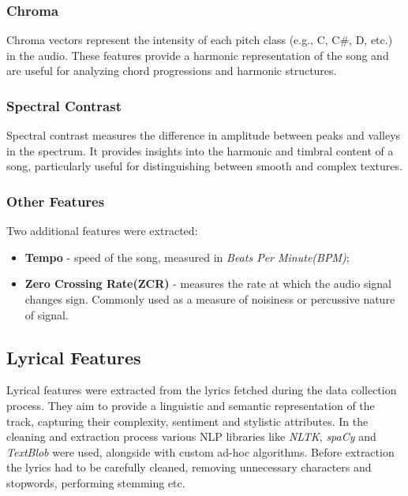 \subsubsection*{Chroma}
Chroma vectors represent the intensity of each pitch class (e.g., C, C#, D, etc.) in the audio.
These features provide a harmonic representation of the song and are useful for analyzing
chord progressions and harmonic structures.

\subsubsection*{Spectral Contrast}
Spectral contrast measures the difference in amplitude between peaks and
valleys in the spectrum. It provides insights into the harmonic and timbral
content of a song, particularly useful for distinguishing between smooth and
complex textures.

\subsubsection*{Other Features}
Two additional features were extracted:
\begin{itemize}
  \item \textbf{Tempo} - speed of the song, measured in
    \textit{Beats Per Minute(BPM)};
  \item \textbf{Zero Crossing Rate(ZCR)} - measures the rate at which the audio
    signal changes sign. Commonly used as a measure of noisiness or
    percussive nature of signal.
\end{itemize}


\subsection{Lyrical Features}
\label{sec:lyricalfeatures}

Lyrical features  were extracted from the lyrics fetched during the data
collection process. They aim to provide a linguistic and semantic
representation of the track, capturing their complexity, sentiment and
stylistic  attributes. In the cleaning and extraction  process various NLP
libraries like \textit{NLTK}, \textit{spaCy} and \textit{TextBlob} were used,
alongside with custom ad-hoc algorithms. Before extraction the lyrics  had to
be carefully cleaned, removing unnecessary characters and stopwords, performing
stemming etc.\cite{nltk} \cite{spacy} \cite{textblob} 

